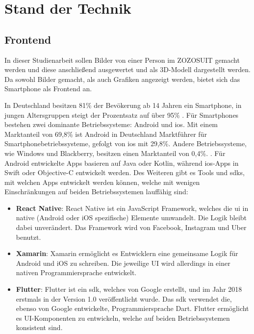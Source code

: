 \chapter{Stand der Technik}
\label{ch:sdt}

\section{Frontend}

In dieser Studienarbeit sollen Bilder von einer Person im ZOZOSUIT gemacht werden und diese anschließend ausgewertet und als 3D-Modell dargestellt werden. Da sowohl Bilder 
gemacht, als auch Grafiken angezeigt werden, bietet sich das Smartphone als Frontend an. 

In Deutschland besitzen 81\% der Bevökerung ab 14 Jahren ein Smartphone, in jungen Altersgruppen steigt der Prozentsatz auf über 95\% \cite{misc:marktforschung_smartphone}. 
Für Smartphones bestehen zwei dominante Betriebssysteme: Android und i\acrshort{os}. Mit einem Marktanteil von 69,8\% ist Android in Deutschland Marktführer für 
Smartphonebetriebssysteme, gefolgt von i\acrshort{os} mit 29,8\%. Andere Betriebssysteme, wie Windows und Blackberry, 
besitzen einen Marktanteil von 0,4\%. \cite{misc:kantarworldpanel}. \newline
Für Android entwickelte Apps basieren auf Java oder Kotlin, während i\acrshort{os}-Apps in Swift oder Objective-C entwickelt werden. Des Weiteren gibt es Tools und \glspl{sdk}, 
mit welchen Apps entwickelt werden können, welche mit wenigen Einschränkungen auf beiden Betriebssystemen lauffähig sind:
\begin{itemize}
    \item \textbf{React Native}: React Native ist ein JavaScript Framework, welches die \gls{ui} in native (Android oder iOS spezifische) Elemente umwandelt. Die Logik bleibt dabei unverändert. Das Framework wird von Facebook, Instagram und Uber benutzt.
    \item \textbf{Xamarin}: Xamarin ermöglicht es Entwicklern eine gemeinsame Logik für Android und iOS zu schreiben. Die jeweilige UI wird allerdings in einer nativen Programmiersprache entwickelt.
    \item \textbf{Flutter}: Flutter ist ein \gls{sdk}, welches von Google erstellt, und im Jahr 2018 erstmals in der Version 1.0 veröffentlicht wurde. Das \gls{sdk} verwendet die, ebenso von Google entwickelte, Programmiersprache Dart. Flutter ermöglicht es UI-Komponenten zu entwickeln, welche auf beiden Betriebssystemen konsistent sind.
\end{itemize}


